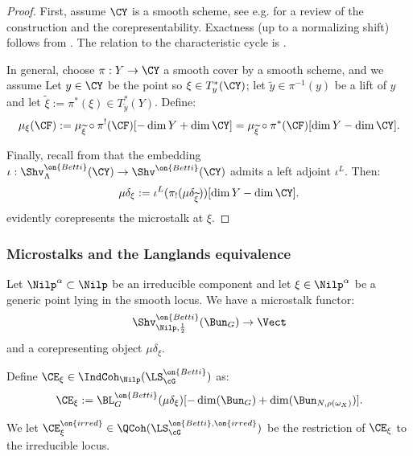 \documentclass[9pt]{amsart}
\theoremstyle{remark}
\theoremstyle{definition}
\theoremstyle{remark}
\numberwithin{equation}{section}
\begin{document}
\begin{proof}

First, assume $\CY$ is a smooth scheme, see 
e.g. \cite[Sect. 4.4]{GPS} for a review of the construction and
the corepresentability. Exactness (up to a normalizing shift) follows
from \cite[Cor. 10.3.13]{KS}. The relation to the characteristic cycle
is \cite[Examples 9.5.7]{KS}.

\medskip

In general, choose $\pi:Y \to \CY$ a smooth
cover by a smooth scheme, and we assume Let $y \in \CY$ be the point so $\xi \in T_y^*(\CY)$; let
$\widetilde{y} \in \pi^{-1}(y)$ be a lift of $y$ and let
$\widetilde{\xi} := \pi^*(\xi) \in T_{\widetilde{y}}^*(Y)$. 
Define: 
%
\[
\mu_{\xi}(\CF) := \mu_{\widetilde{\xi}}\circ \pi^!(\CF)[-\dim Y + \dim \CY] = 
\mu_{\widetilde{\xi}}\circ \pi^*(\CF)[\dim Y - \dim \CY].
\]

Finally, recall from \cite[Cor. G.7.6]{AGKRRV} that the embedding
$\iota:\Shv_{\Lambda}^{\on{Betti}}(\CY) \to \Shv^{\on{Betti}}(\CY)$
admits a left adjoint $\iota^L$. Then:
%
\[
\mu\delta_{\xi} := \iota^L(\pi_!(\mu\delta_{\widetilde{\xi}}))[\dim Y -\dim \CY].
\]
%
\noindent evidently corepresents the microstalk at $\xi$.

\end{proof}

\subsubsection{Microstalks and the Langlands equivalence}

Let $\Nilp^{\alpha} \subset \Nilp$ be an irreducible component and
let $\xi \in \Nilp^{\alpha}$ be a generic point lying in the smooth locus. 
We have a microstalk functor:
%
\[
\Shv_{\Nilp,\frac{1}{2}}^{\on{Betti}}(\Bun_G) \to \Vect
\]
%
\noindent and a corepresenting object $\mu\delta_{\xi}$.

\medskip 

Define $\CE_{\xi} \in \IndCoh_{\Nilp}(\LS_{\cG}^{\on{Betti}})$ as: 
%
\[
\CE_{\xi} := \BL_G^{\on{Betti}}(\mu\delta_{\xi})
[-\dim(\Bun_G) + \dim(\Bun_{N,\rho(\omega_X)})].
\]

We let $\CE_{\xi}^{\on{irred}} \in \QCoh(\LS_{\cG}^{\on{Betti},\on{irred}})$
be the restriction of $\CE_{\xi}$ to the irreducible locus.

\subsubsection{}
\end{document}
